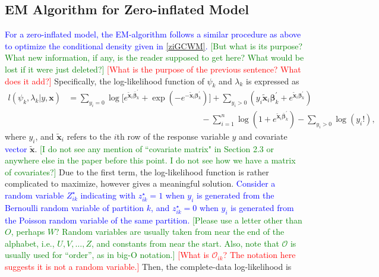 \documentclass[11pt,letterpaper]{article}
\numberwithin{equation}{section}
\numberwithin{equation}{section}
\numberwithin{equation}{section}
\newcommand{\xTilda}{\tilde{\bm{x}}}
\newcommand{\zZ}{Z^\star}
\newcommand{\zz}{z^\star}
\begin{document}
\subsection{EM Algorithm for Zero-inflated Model} 
\textcolor{blue}{For a zero-inflated model, the EM-algorithm follows a similar procedure as above to optimize the conditional density given in \eqref{ziGCWM}. }  \textcolor{green}{[But what is its purpose? What new information, if any, is the reader supposed to get here? What would be lost if it were just deleted?]} \textcolor{red}{[What is the purpose of the previous sentence? What does it add?]} Specifically, the log-likelihood function of $\psi_k$ and $\lambda_k$ is expressed as
\begin{equation*}\begin{split}
l(\psi_k,\lambda_k|y,\bm{x}) &= \sum_{y_i = 0} \log \big[ e^{ \bm{ \xTilda}_i \bm{\bar{\beta}}_k^{'}  } + \exp{( - e^ { -\bm{\xTilda}_i \bm{\beta}_k^{'} })} \big] + \sum_{y_i > 0 } \left( y_i \xTilda_i \bm{\beta}_k^{'} + e^{ \xTilda_i \bm{\beta}_k^{'} } \right)\\ &\qquad\qquad\qquad\qquad\qquad\qquad\qquad\qquad- \sum_{i=1}^n  \log \left(1 + e^ {\xTilda_i \bm{\bar{\beta}}_k^{'} } \right) - \sum_{y_i > 0} \log(y_i ! ),
\end{split}\end{equation*}
where $y_i$, and $\xTilda_i$ refers to the $i$th row of the response variable $y$ and covariate \textcolor{blue}{vector} $\xTilda$. \textcolor{green}{[I do not see any mention of ``covariate matrix" in Section 2.3 or anywhere else in the paper before this point. I do not see how we have a matrix of covariates?]}  Due to the first term, the log-likelihood function is rather complicated to maximize, however \cite{Lambert} gives a meaningful solution. \textcolor{blue}{ Consider a random variable $\zZ_{ik}$ indicating with ${\zz_{ik}} = 1$ when $y_i$ is generated from the Bernoulli random variable of partition $k$, and $\zz_{ik} = 0$ when $y_i$ is generated from the Poisson random variable of the same partition.} \textcolor{green}{[Please use a letter other than $O$, perhaps $W$? Random variables are usually taken from near the end of the alphabet, i.e., $U,V,\ldots,Z$, and constants from near the start. Also, note that $\mathcal{O}$ is usually used for ``order'', as in big-O notation.]} \textcolor{red}{[What is ${\mathcal{O}_{ik}}$? The notation here suggests it is not a random variable.]}  Then, the complete-data log-likelihood is 
\end{document}
